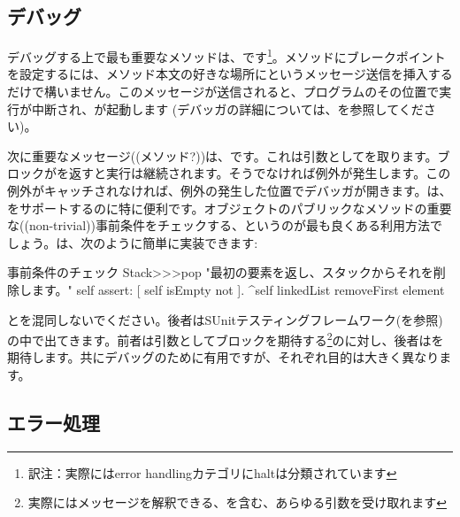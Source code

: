 \documentclass[a4paper,10pt,twoside]{book}
\begin{document}

\subsection{デバッグ}

デバッグする上で最も重要なメソッドは、です\footnote{訳注：実際にはerror handlingカテゴリにhaltは分類されています}。メソッドにブレークポイントを設定するには、メソッド本文の好きな場所にというメッセージ送信を挿入するだけで構いません。このメッセージが送信されると、プログラムのその位置で実行が中断され、が起動します
(デバッガの詳細については、を参照してください)。


次に重要なメッセージ((メソッド?))は、です。これは引数としてを取ります。ブロックがを返すと実行は継続されます。そうでなければ例外が発生します。この例外がキャッチされなければ、例外の発生した位置でデバッガが開きます。は、をサポートするのに特に便利です。オブジェクトのパブリックなメソッドの重要な((non-trivial))事前条件をチェックする、というのが最も良くある利用方法でしょう。は、次のように簡単に実装できます:

\begin{method}{事前条件のチェック}
Stack>>>pop
    "最初の要素を返し、スタックからそれを削除します。"
    self assert: [ self isEmpty not ].
    ^self linkedList removeFirst element
\end{method}

とを混同しないでください。後者はSUnitテスティングフレームワーク(を参照)の中で出てきます。前者は引数としてブロックを期待する\footnote{実際にはメッセージを解釈できる、を含む、あらゆる引数を受け取れます}のに対し、後者はを期待します。共にデバッグのために有用ですが、それぞれ目的は大きく異なります。

\subsection{エラー処理}
\end{document}
